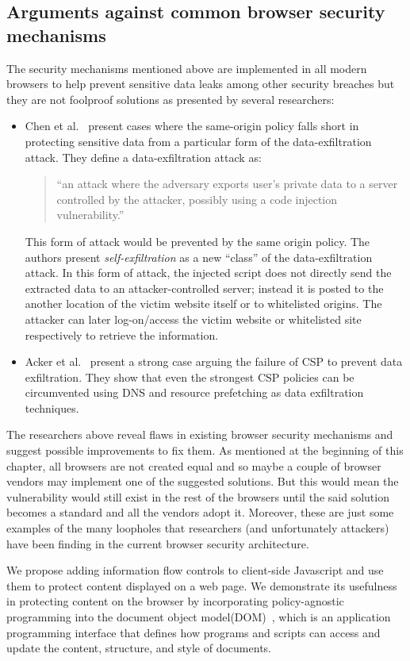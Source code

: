 \subsection{Arguments against common browser security mechanisms \label{sec:against}}
The security mechanisms mentioned above are implemented in all modern browsers to
help prevent sensitive data leaks among other security breaches but they are not
foolproof solutions as presented by several researchers:
\begin{itemize}
  \item Chen et al.~\cite{SelfExfil} present cases where the same-origin policy falls short
  in protecting sensitive data from a particular form of the data-exfiltration attack.
  They define a data-exfiltration attack as:

  \begin{quotation}
    ``an attack where the adversary exports user's private data to a server controlled
    by the attacker, possibly using a code injection vulnerability.''
  \end{quotation}
  This form of attack would be prevented by the same origin policy. The authors present
  \textit{self-exfiltration} as a new ``class'' of the data-exfiltration attack. In
  this form of attack, the injected script does not directly send the extracted data
  to an attacker-controlled server; instead it is posted to the another location
  of the victim website itself or to whitelisted origins. The attacker can later
  log-on/access the victim website or whitelisted site respectively to retrieve the
  information.

  \item Acker et al.~\cite{DataExfilCSP} present a strong case arguing the failure of
  CSP to prevent data exfiltration. They show that even the strongest CSP policies
  can be circumvented using DNS and resource prefetching as data exfiltration
  techniques.
\end{itemize}
The researchers above reveal flaws in existing browser security mechanisms and suggest
possible improvements to fix them. As mentioned at the beginning of this chapter,
all browsers are not created equal and so maybe a couple of browser vendors may
implement one of the suggested solutions. But this would mean the vulnerability
would still exist in the rest of the browsers until the said solution becomes a
standard and all the vendors adopt it. Moreover, these are just some examples of
the many loopholes that researchers (and unfortunately attackers) have been finding
in the current browser security architecture.

We propose adding information flow controls to client-side Javascript and use them
to protect content displayed on a web page. We demonstrate its usefulness in
protecting content on the browser by incorporating policy-agnostic programming into
the document object model(DOM)~\cite{DOM}, which is an application programming
interface that defines how programs and scripts can access and update the content,
structure, and style of documents.


